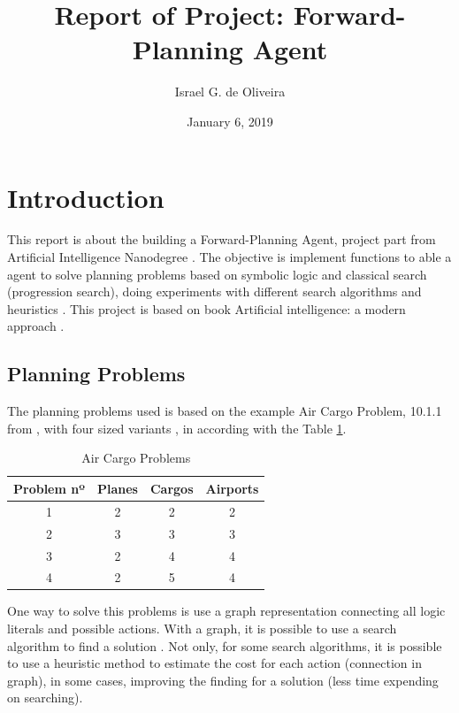 \documentclass[a4paper]{article}
\title{Report of Project: Forward-Planning Agent}
\author{Israel G. de Oliveira}
\date{January 6, 2019}
\begin{document}
\maketitle

\section{Introduction}
This report is about the building a Forward-Planning Agent, project part from Artificial Intelligence Nanodegree \cite{githubUdacityAIND}. The objective is implement functions to able a agent to solve planning problems based on symbolic logic and classical search (progression search), doing experiments with different search algorithms and heuristics \cite{githubUdacityAINDProj2}. This project is based on book Artificial intelligence: a modern approach \cite{russell2009artificial}.

\subsection{Planning Problems}

The planning problems used is based on the example Air Cargo Problem, 10.1.1 from \cite{russell2009artificial}, with four sized variants \cite{githubUdacityAINDProj2}, in according with the Table \ref{airps}. 

\begin{table}[htpb]
   \caption{ Air Cargo Problems}
    \label{tab:cronograma}
    \centering
        \begin{tabular}{ c | c | c | c}
           Problem nº & Planes & Cargos & Airports \\\hline
           1          & 2      & 2      & 2 \\
           2          & 3      & 3      & 3 \\
           3          & 2      & 4      & 4 \\
           4          & 2      & 5      & 4 \\\hline
        \end{tabular}
        \label{airps}
\end{table}

One way to solve this problems is use a graph representation connecting all logic literals and possible actions. With a graph, it is possible to use a search algorithm to find a solution \cite{russell2009artificial}. Not only, for some search algorithms, it is possible to use a heuristic method to estimate the cost for each action (connection in graph), in some cases, improving the finding for a solution (less time expending on searching).
\end{document}
